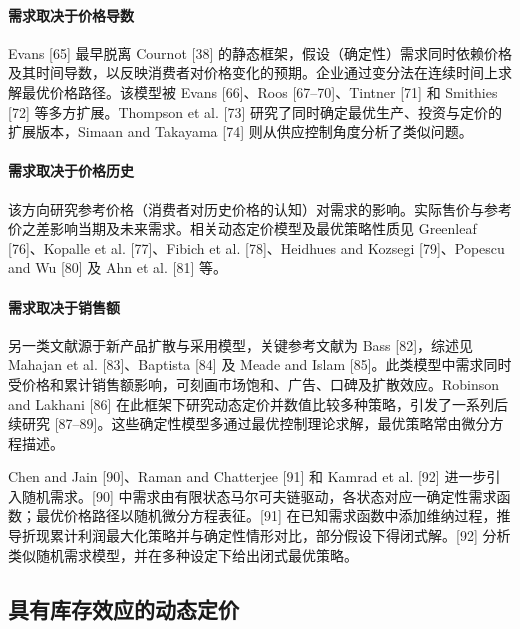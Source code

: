 \paragraph{需求取决于价格导数}\label{demand-depends-on-price-derivatives}

Evans [65] 最早脱离 Cournot [38] 的静态框架，假设（确定性）需求同时依赖价格及其时间导数，以反映消费者对价格变化的预期。企业通过变分法在连续时间上求解最优价格路径。该模型被 Evans [66]、Roos [67–70]、Tintner [71] 和 Smithies [72] 等多方扩展。Thompson et al. [73] 研究了同时确定最优生产、投资与定价的扩展版本，Simaan and Takayama [74] 则从供应控制角度分析了类似问题。

\paragraph{需求取决于价格历史}\label{demand-depends-on-price-history}

该方向研究参考价格（消费者对历史价格的认知）对需求的影响。实际售价与参考价之差影响当期及未来需求。相关动态定价模型及最优策略性质见 Greenleaf [76]、Kopalle et al. [77]、Fibich et al. [78]、Heidhues and Kozsegi [79]、Popescu and Wu [80] 及 Ahn et al. [81] 等。

\paragraph{需求取决于销售额}\label{demand-depends-on-amount-of-sales}

另一类文献源于新产品扩散与采用模型，关键参考文献为 Bass [82]，综述见 Mahajan et al. [83]、Baptista [84] 及 Meade and Islam [85]。此类模型中需求同时受价格和累计销售额影响，可刻画市场饱和、广告、口碑及扩散效应。Robinson and Lakhani [86] 在此框架下研究动态定价并数值比较多种策略，引发了一系列后续研究 [87–89]。这些确定性模型多通过最优控制理论求解，最优策略常由微分方程描述。

Chen and Jain [90]、Raman and Chatterjee [91] 和 Kamrad et al. [92] 进一步引入随机需求。[90] 中需求由有限状态马尔可夫链驱动，各状态对应一确定性需求函数；最优价格路径以随机微分方程表征。[91] 在已知需求函数中添加维纳过程，推导折现累计利润最大化策略并与确定性情形对比，部分假设下得闭式解。[92] 分析类似随机需求模型，并在多种设定下给出闭式最优策略。

\subsection{具有库存效应的动态定价}\label{dynamic-pricing-with-inventory-effects}


